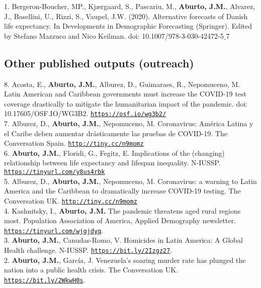 \documentclass[12pt]{article}
\providecommand*\url[1]{\href{#1}{#1}}
\renewcommand*\url[1]{\href{#1}{\texttt{#1}}}
\begin{document}
1. Bergeron-Boucher, MP., Kj{\ae}rgaard, S.,  Pascariu, M., \textbf{Aburto, J.M.},  Alvarez, J., Basellini, U.,  Rizzi, S., Vaupel, J.W. (2020). Alternative forecasts of Danish life expectancy. In Developments in Demographic Forecasting (Springer). Edited by Stefano Mazzuco and Nico Keilman. doi: 10.1007/978-3-030-42472-5$\_$7\\
		  		  
\subsection*{Other published outputs (outreach)}	

8. Acosta, E., \textbf{Aburto, J.M.}, Alburez, D., Guimaraes, R., Nepomuceno, M.  Latin American and Caribbean governments must increase the COVID-19 test coverage drastically to mitigate the humanitarian impact of the pandemic. doi: 10.17605/OSF.IO/WG3B2. \url{https://osf.io/wg3b2/}\\

7. Alburez, D., \textbf{Aburto, J.M.}, Nepomuceno, M. Coronavirus: América Latina y el Caribe deben aumentar drásticamente las pruebas de COVID-19. The Conversation Spain. \url{http://tiny.cc/n9momz}\\

6. \textbf{Aburto, J.M.}, Floridi, G., Fegitz, E. Implications of the (changing) relationship between life expectancy and lifespan inequality. N-IUSSP. \url{https://tinyurl.com/y8us4rbk}\\

5. Alburez, D., \textbf{Aburto, J.M.}, Nepomuceno, M. Coronavirus: a warning to Latin America and the Caribbean to dramatically increase COVID-19 testing. The Conversation UK. \url{http://tiny.cc/n9momz}\\

4. Kashnitsky, I., \textbf{Aburto, J.M.} The pandemic threatens aged rural regions most. Population Association of America, Applied Demography newsletter. \url{https://tinyurl.com/wjgjdyq}.\\

3. \textbf{Aburto, J.M.}, Canudas-Romo, V. Homicides in Latin America: A Global Health challenge. N-IUSSP. \url{https://bit.ly/2Izgz27}.\\

2. \textbf{Aburto, J.M.}, Garc\'ia, J. Venezuela's soaring murder rate has plunged the nation into a public health crisis. The Conversation UK.\\ \url{https://bit.ly/2WkwH0s}.\\
\end{document}
